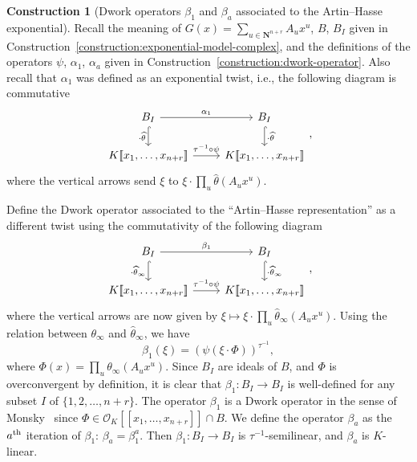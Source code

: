 \documentclass{amsart}
\numberwithin{equation}{section}
\theoremstyle{plain}
\theoremstyle{definition}
\newtheorem{construction}[equation]{Construction}
\renewcommand{\mathbb}{\mathbf}
\begin{document}
\begin{construction}[Dwork operators \(\beta_{1}\) and \(\beta_{a}\) associated to the Artin--Hasse exponential]
\label{construction:better-dwork-operator}
Recall the meaning of
\(G(x) = \sum_{u\in\mathbb{N}^{n+r}} A_{u} x^{u}\), \(B\), \(B_{I}\)
given in Construction~\ref{construction:exponential-model-complex},
and the definitions of the operators \(\psi\), \(\alpha_{1}\), \(\alpha_{a}\)
given in Construction~\ref{construction:dwork-operator}.  Also recall
that \(\alpha_{1}\) was defined as an exponential twist, i.e., the
following diagram is commutative
\begin{equation*}
\begin{tikzcd}
B_{I} \ar[d,hook,"\cdot\widehat{\theta}",swap] \ar[r,"\alpha_{1}"] & B_{I} \ar[d,hook,"\cdot\widehat{\theta}"] \\
K[\![x_{1},\ldots,x_{n+r}]\!] \ar[r,"\tau^{-1}\circ\psi"] & K[\![x_{1},\ldots,x_{n+r}]\!]
\end{tikzcd},
\end{equation*}
where the vertical arrows send \(\xi\) to
\(\xi\cdot\prod_{u}\widehat{\theta}(A_{u}x^{u})\).

Define the Dwork operator associated to the ``Artin--Hasse
representation'' as a different twist using the commutativity of the
following diagram
\begin{equation*}
\begin{tikzcd}
B_{I} \ar["\cdot\widehat{\theta}_{\infty}",swap,d,hook] \ar[r,"\beta_{1}"] &
B_{I} \ar[d,"\cdot\widehat{\theta}_{\infty}",hook] \\
K[\![x_{1},\ldots,x_{n+r}]\!] \ar[r,"\tau^{-1}\circ\psi"] & K[\![x_{1},\ldots,x_{n+r}]\!]
\end{tikzcd},
\end{equation*}
where the vertical arrows are now given by
\(\xi \mapsto \xi \cdot \prod_{u}\widehat{\theta}_{\infty}(A_{u}x^{u})\).
Using the relation between \(\theta_{\infty}\) and \(\widehat{\theta}_{\infty}\),
we have
\begin{equation*}
\beta_{1}(\xi) =  \left(\psi(\xi\cdot \Phi)\right)^{\tau^{-1}} ,
\end{equation*}
where \(\Phi(x) = \prod_{u} \theta_{\infty}(A_{u}x^{u})\).  Since
\(B_{I}\) are ideals of \(B\), and \(\Phi\) is overconvergent by
definition, it is clear that \(\beta_{1}\colon B_{I} \to B_{I}\) is
well-defined for any subset \(I\) of \(\{1,2,\ldots,n+r\}\).  The
operator \(\beta_{1}\) is a Dwork operator in the sense of
Monsky~\cite{monsky:formal-cohomology-3} since
\(\Phi \in \mathcal{O}_{K}[\![x_{1},\ldots,x_{n+r}]\!] \cap B\).  We
define the operator \(\beta_{a}\) as the \(a\textsuperscript{th}\)
iteration of \(\beta_{1}\): \(\beta_{a} = \beta_{1}^{a}\).  Then
\(\beta_{1} \colon B_{I} \to B_{I}\) is \(\tau^{-1}\)-semilinear, and
\(\beta_{a}\) is \(K\)-linear.
\end{construction}
\end{document}
